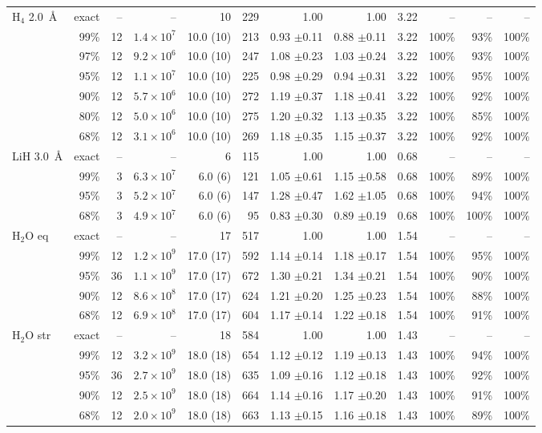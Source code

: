 \begin{table}[!htb]
\begin{tabular}{lrrrrrrrrrrr}
\midrule
H$_4$ 2.0~\AA & exact & -- & -- & 10 & 229 & 1.00 & 1.00 & 3.22 & -- & -- & -- \\
 & 99\% & 12 & $1.4\times10^{7}$ & 10.0 (10) & 213 & 0.93 $\pm$0.11 & 0.88 $\pm$0.11 & 3.22 & 100\% & 93\% & 100\% \\
 & 97\% & 12 & $9.2\times10^{6}$ & 10.0 (10) & 247 & 1.08 $\pm$0.23 & 1.03 $\pm$0.24 & 3.22 & 100\% & 93\% & 100\% \\
 & 95\% & 12 & $1.1\times10^{7}$ & 10.0 (10) & 225 & 0.98 $\pm$0.29 & 0.94 $\pm$0.31 & 3.22 & 100\% & 95\% & 100\% \\
 & 90\% & 12 & $5.7\times10^{6}$ & 10.0 (10) & 272 & 1.19 $\pm$0.37 & 1.18 $\pm$0.41 & 3.22 & 100\% & 92\% & 100\% \\
 & 80\% & 12 & $5.0\times10^{6}$ & 10.0 (10) & 275 & 1.20 $\pm$0.32 & 1.13 $\pm$0.35 & 3.22 & 100\% & 85\% & 100\% \\
 & 68\% & 12 & $3.1\times10^{6}$ & 10.0 (10) & 269 & 1.18 $\pm$0.35 & 1.15 $\pm$0.37 & 3.22 & 100\% & 92\% & 100\% \\
\midrule
LiH 3.0~\AA & exact & -- & -- & 6 & 115 & 1.00 & 1.00 & 0.68 & -- & -- & -- \\
 & 99\% & 3 & $6.3\times10^{7}$ & 6.0 (6) & 121 & 1.05 $\pm$0.61 & 1.15 $\pm$0.58 & 0.68 & 100\% & 89\% & 100\% \\
 & 95\% & 3 & $5.2\times10^{7}$ & 6.0 (6) & 147 & 1.28 $\pm$0.47 & 1.62 $\pm$1.05 & 0.68 & 100\% & 94\% & 100\% \\
 & 68\% & 3 & $4.9\times10^{7}$ & 6.0 (6) & 95 & 0.83 $\pm$0.30 & 0.89 $\pm$0.19 & 0.68 & 100\% & 100\% & 100\% \\
\midrule
H$_2$O eq & exact & -- & -- & 17 & 517 & 1.00 & 1.00 & 1.54 & -- & -- & -- \\
 & 99\% & 12 & $1.2\times10^{9}$ & 17.0 (17) & 592 & 1.14 $\pm$0.14 & 1.18 $\pm$0.17 & 1.54 & 100\% & 95\% & 100\% \\
 & 95\% & 36 & $1.1\times10^{9}$ & 17.0 (17) & 672 & 1.30 $\pm$0.21 & 1.34 $\pm$0.21 & 1.54 & 100\% & 90\% & 100\% \\
 & 90\% & 12 & $8.6\times10^{8}$ & 17.0 (17) & 624 & 1.21 $\pm$0.20 & 1.25 $\pm$0.23 & 1.54 & 100\% & 88\% & 100\% \\
 & 68\% & 12 & $6.9\times10^{8}$ & 17.0 (17) & 604 & 1.17 $\pm$0.14 & 1.22 $\pm$0.18 & 1.54 & 100\% & 91\% & 100\% \\
\midrule
H$_2$O str & exact & -- & -- & 18 & 584 & 1.00 & 1.00 & 1.43 & -- & -- & -- \\
 & 99\% & 12 & $3.2\times10^{9}$ & 18.0 (18) & 654 & 1.12 $\pm$0.12 & 1.19 $\pm$0.13 & 1.43 & 100\% & 94\% & 100\% \\
 & 95\% & 36 & $2.7\times10^{9}$ & 18.0 (18) & 635 & 1.09 $\pm$0.16 & 1.12 $\pm$0.18 & 1.43 & 100\% & 92\% & 100\% \\
 & 90\% & 12 & $2.5\times10^{9}$ & 18.0 (18) & 664 & 1.14 $\pm$0.16 & 1.17 $\pm$0.20 & 1.43 & 100\% & 91\% & 100\% \\
 & 68\% & 12 & $2.0\times10^{9}$ & 18.0 (18) & 663 & 1.13 $\pm$0.15 & 1.16 $\pm$0.18 & 1.43 & 100\% & 89\% & 100\% \\
\bottomrule
\end{tabular}
\end{table}
